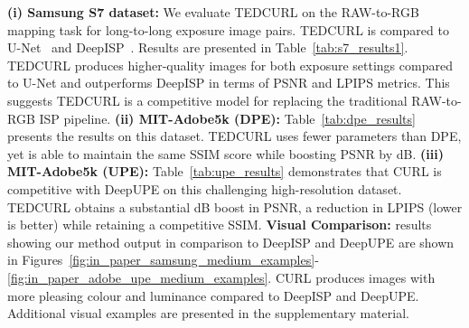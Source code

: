 \documentclass[a4paper,conference]{IEEEtran}
\begin{document}
\begin{table}[t] 
\centering
\small
\caption{\small\textbf{Medium-to-medium} exposure RAW to RGB mapping results on the held-out test images of the \textbf{Samsung S7 dataset}~\cite{schwartz19}.} 
\label{tab:s7_results1}
\end{table}

{}\quad \textbf{(i) Samsung S7 dataset:} We evaluate TEDCURL on the RAW-to-RGB mapping task for long-to-long exposure image pairs. TEDCURL is compared to U-Net~\cite{Ronneberger15} and DeepISP~\cite{schwartz19}. Results are presented in Table~\ref{tab:s7_results1}. TEDCURL produces higher-quality images for both exposure settings compared to U-Net and outperforms DeepISP in terms of PSNR and LPIPS metrics. This suggests TEDCURL is a competitive model for replacing the traditional RAW-to-RGB ISP pipeline. \textbf{(ii) MIT-Adobe5k (DPE):} Table~\ref{tab:dpe_results} presents the results on this dataset. TEDCURL uses  fewer parameters than DPE, yet is able to maintain the same SSIM score while boosting PSNR by dB. \textbf{(iii) MIT-Adobe5k (UPE):}  Table~\ref{tab:upe_results} demonstrates that CURL is competitive with DeepUPE on this challenging high-resolution dataset. TEDCURL obtains a substantial dB boost in PSNR, a reduction in LPIPS (lower is better) while retaining a competitive SSIM. \textbf{Visual Comparison:} results showing our method output in comparison to DeepISP and DeepUPE are shown in Figures~\ref{fig:in_paper_samsung_medium_examples}-\ref{fig:in_paper_adobe_upe_medium_examples}. CURL produces images with more pleasing colour and luminance compared to DeepISP and DeepUPE. Additional visual examples are presented in the supplementary material.
\end{document}
